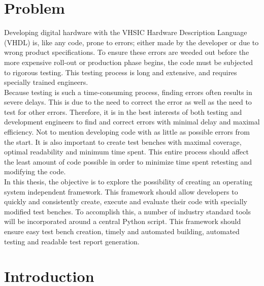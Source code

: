 \documentclass[11pt,british]{article}
\begin{document}
\section{Problem}
Developing digital hardware with the \gls{VHSIC} Hardware Description Language (\gls{VHDL}) is, like any code, prone to errors; either made by the developer or due to wrong product specifications. To ensure these errors are weeded out before the more expensive roll-out or production phase begins, the code must be subjected to rigorous testing. This testing process is long and extensive, and requires specially trained engineers.
\\[\baselineskip]
Because testing is such a time-consuming process, finding errors often results in severe delays. This is due to the need to correct the error as well as the need to test for other errors. Therefore, it is in the best interests of both testing and development engineers to find and correct errors with minimal delay and maximal efficiency. Not to mention developing code with as little as possible errors from the start. It is also important to create test benches with maximal coverage, optimal readability and minimum time spent. This entire process should affect the least amount of code possible in order to minimize time spent retesting and modifying the code.
\\[\baselineskip]
In this thesis, the objective is to explore the possibility of creating an operating system independent framework. This framework should allow developers to quickly and consistently create, execute and evaluate their code with specially modified test benches. To accomplish this, a number of industry standard tools will be incorporated around a central Python script. This framework should ensure easy test bench creation, timely and automated building, automated  testing and readable test report generation.




\newpage{}


\section{Introduction}
\label{sec:intro}
\end{document}
